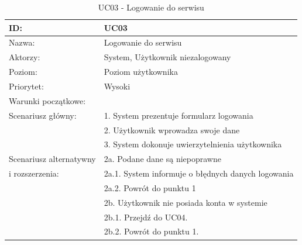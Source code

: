 \begin{table}[H]
    \begin{tabular}{|p{5cm}|p{9cm}|}\hline
    ID: & UC03 \\\hline
    Nazwa: & Logowanie do serwisu \\\hline
    Aktorzy: & System, Użytkownik niezalogowany \\\hline
    Poziom: & Poziom użytkownika  \\\hline
    Priorytet: & Wysoki \\\hline
    Warunki początkowe: & ~ \\\hline
    Scenariusz główny: & 1. System prezentuje formularz logowania \\
    ~ & 2. Użytkownik wprowadza swoje dane \\
    ~ & 3. System dokonuje uwierzytelnienia użytkownika \\ \hline
    Scenariusz alternatywny & 2a. Podane dane są niepoprawne \\
    i rozszerzenia: & 2a.1. System informuje o błędnych danych logowania \\
    ~ & 2a.2. Powrót do punktu 1 \\
    ~ & 2b. Użytkownik nie posiada konta w systemie \\
    ~ & 2b.1. Przejdź do UC04. \\
    ~ & 2b.2. Powrót do punktu 1.  \\
    \hline\end{tabular}
	\caption{UC03 - Logowanie do serwisu}
\end{table}

